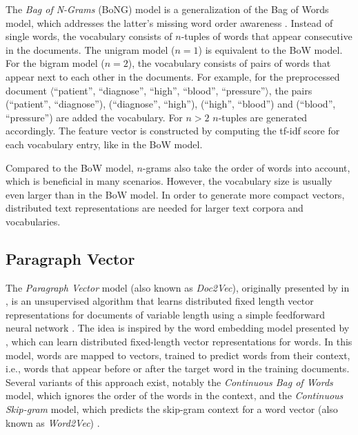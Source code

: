 The \textit{Bag of N-Grams} (BoNG) model is a generalization of the Bag of Words model, which addresses the latter’s missing word order awareness \cite{brown1992class}.
Instead of single words, the vocabulary consists of $n$-tuples of words that appear consecutive in the documents.
The unigram model ($n=1$) is equivalent to the BoW model.
For the bigram model ($n=2$), the vocabulary consists of pairs of words that appear next to each other in the documents.
For example, for the preprocessed document $\langle$\enquote{patient},  \enquote{diagnose},  \enquote{high},  \enquote{blood},  \enquote{pressure}$\rangle$, the pairs (\enquote{patient},  \enquote{diagnose}), (\enquote{diagnose},  \enquote{high}), (\enquote{high},  \enquote{blood}) and (\enquote{blood},  \enquote{pressure}) are added the vocabulary.
For $n>2$ $n$-tuples are generated accordingly.
The feature vector is constructed by computing the tf-idf score for each vocabulary entry, like in the BoW model.

Compared to the BoW model, $n$-grams also take the order of words into account, which is beneficial in many scenarios.
However, the vocabulary size is usually even larger than in the BoW model.
In order to generate more compact vectors, distributed text representations are needed for larger text corpora and vocabularies.

\subsection{Paragraph Vector}

The \textit{Paragraph Vector} model (also known as \textit{Doc2Vec}), originally presented by \citeauthor{DBLP:conf/icml/LeM14} in \citeyear{DBLP:conf/icml/LeM14}, is an unsupervised algorithm that learns distributed fixed length vector representations for documents of variable length using a simple feedforward neural network \cite{DBLP:conf/icml/LeM14}.
The idea is inspired by the word embedding model presented by \citeauthor{DBLP:journals/jmlr/BengioDVJ03} \cite{DBLP:journals/jmlr/BengioDVJ03}, which can learn distributed fixed-length vector representations for words.
In this model, words are mapped to vectors, trained to predict words from their context, i.e., words that appear before or after the target word in the training documents.
Several variants of this approach exist, notably the \textit{Continuous Bag of Words} model, which ignores the order of the words in the context, and the \textit{Continuous Skip-gram} model, which predicts the skip-gram context for a word vector (also known as \textit{Word2Vec}) \cite{DBLP:journals/corr/abs-1301-3781}.

